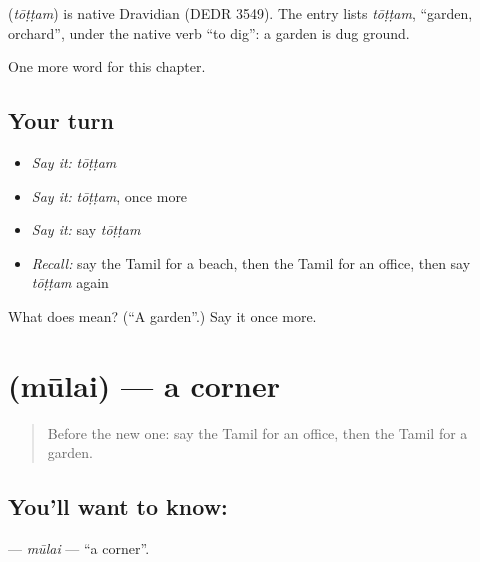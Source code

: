 \begin{cousinweb}
\textbf{} (\emph{tōṭṭam}) is native Dravidian (DEDR 3549). The entry lists \emph{tōṭṭam}, \textquotedblleft{}garden, orchard\textquotedblright{}, under the native verb \textquotedblleft{}to dig\textquotedblright{}: a garden is dug ground.
\end{cousinweb}

\begin{grammarlens}[title={What you've built}]
One more word for this chapter.
\end{grammarlens}

\subsection*{Your turn}
\begin{itemize}
\raggedright
  \item \emph{Say it:} \emph{tōṭṭam}
  \item \emph{Say it:} \emph{tōṭṭam}, once more
  \item \emph{Say it:} say \emph{tōṭṭam}
  \item \emph{Recall:} say the Tamil for a beach, then the Tamil for an office, then say \emph{tōṭṭam} again
\end{itemize}

\begin{tcolorbox}[breakable,colback=teal!4,colframe=teal!35!black,title={Before you move on}]
What does  mean? (\textquotedblleft{}A garden\textquotedblright{}.) Say it once more.
\end{tcolorbox}
\section[\texorpdfstring{\ta{மூலை} (mūlai)}{மூலை (mūlai)}]{ (mūlai) — a corner}

\label{lesson:TA-C116-mulai}



\begin{quote}
Before the new one: say the Tamil for an office, then the Tamil for a garden.
\end{quote}

\subsection*{You'll want to know: }
\textbf{} — \emph{mūlai} — \textquotedblleft{}a corner\textquotedblright{}.

